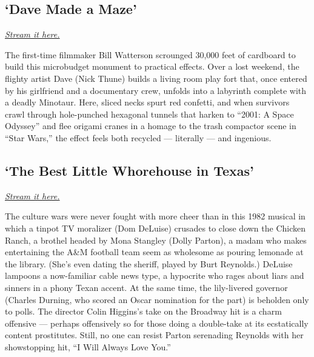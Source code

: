 \hypertarget{dave-made-a-maze}{%
\subsection{`Dave Made a Maze'}\label{dave-made-a-maze}}

\href{https://www.peacocktv.com/watch/asset/movies/comedy/dave-made-a-maze/23c9a70b-1953-3e97-ab47-474c8369f657}{\emph{Stream
it here.}}

The first-time filmmaker Bill Watterson scrounged 30,000 feet of
cardboard to build this microbudget monument to practical effects. Over
a lost weekend, the flighty artist Dave (Nick Thune) builds a living
room play fort that, once entered by his girlfriend and a documentary
crew, unfolds into a labyrinth complete with a deadly Minotaur. Here,
sliced necks spurt red confetti, and when survivors crawl through
hole-punched hexagonal tunnels that harken to ``2001: A Space Odyssey''
and flee origami cranes in a homage to the trash compactor scene in
``Star Wars,'' the effect feels both recycled --- literally --- and
ingenious.

\hypertarget{the-best-little-whorehouse-in-texas}{%
\subsection{`The Best Little Whorehouse in
Texas'}\label{the-best-little-whorehouse-in-texas}}

\href{https://www.peacocktv.com/watch/asset/movies/musical/the-best-little-whorehouse-in-texas/1d2e374d-b059-3971-93fe-9d87b979238d}{\emph{Stream
it here.}}

The culture wars were never fought with more cheer than in this 1982
musical in which a tinpot TV moralizer (Dom DeLuise) crusades to close
down the Chicken Ranch, a brothel headed by Mona Stangley (Dolly
Parton), a madam who makes entertaining the A\&M football team seem as
wholesome as pouring lemonade at the library. (She's even dating the
sheriff, played by Burt Reynolds.) DeLuise lampoons a now-familiar cable
news type, a hypocrite who rages about liars and sinners in a phony
Texan accent. At the same time, the lily-livered governor (Charles
Durning, who scored an Oscar nomination for the part) is beholden only
to polls. The director Colin Higgins's take on the Broadway hit is a
charm offensive --- perhaps offensively so for those doing a double-take
at its ecstatically content prostitutes. Still, no one can resist Parton
serenading Reynolds with her showstopping hit, ``I Will Always Love
You.''


